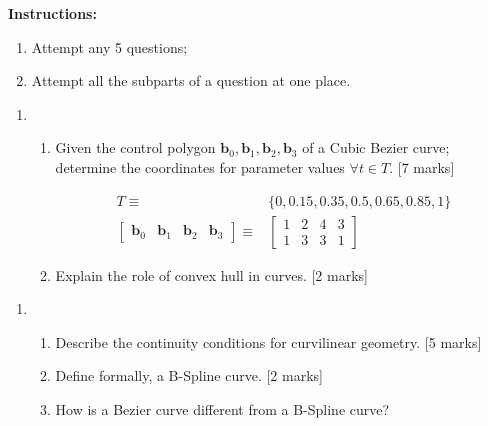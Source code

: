 \documentclass[11pt,a4paper,onecolumn]{qptiet}
\date{28 May 2024}
\begin{document}
\maketitle
\textbf{Instructions:}
\begin{enumerate}
\item Attempt any 5 questions;
\item Attempt all the subparts of a question at one
  place.
\end{enumerate}
\bvrhrule[0.4pt]
\begin{enumerate}
\item
  \begin{enumerate}
  \item Given the control polygon
    $\textbf{b}_0, \textbf{b}_1, \textbf{b}_2,
    \textbf{b}_3$ of a Cubic Bezier curve; determine
    the coordinates for parameter values
    $\forall t\in T$. \hfill [7 marks]

    \begin{align*}
      T \equiv
      & \{0, 0.15, 0.35, 0.5, 0.65, 0.85, 1\} \\
      \begin{bmatrix}
        \textbf{b}_0 &\textbf{b}_1& \textbf{b}_2& \textbf{b}_3
      \end{bmatrix} \equiv
      & \begin{bmatrix}
        1&2&4&3\\ 1&3&3&1
      \end{bmatrix}
    \end{align*}
  \item Explain the role of convex hull in curves.
    \hfill[2 marks]
  \end{enumerate}
\end{enumerate}
\bvrhrule[0.4pt]
\begin{enumerate}[resume]
\item
  \begin{enumerate}
  \item Describe the continuity conditions for
    curvilinear geometry.
    \hfill[5 marks]
  \item Define formally, a B-Spline curve. \hfill [2
    marks]
  \item How is a Bezier curve different from a B-Spline
    curve?
  \end{enumerate}
\end{enumerate}
\bvrhrule[0.4pt]
\end{document}
